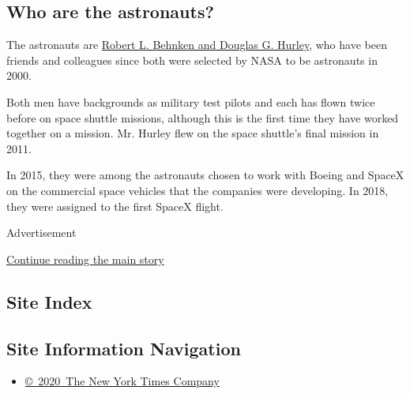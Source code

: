 \hypertarget{who-are-the-astronauts}{%
\subsection{Who are the astronauts?}\label{who-are-the-astronauts}}

The astronauts are
\href{https://www.nytimes3xbfgragh.onion/2020/05/27/science/bob-behnken-doug-hurley.html}{Robert
L. Behnken and Douglas G. Hurley}, who have been friends and colleagues
since both were selected by NASA to be astronauts in 2000.

Both men have backgrounds as military test pilots and each has flown
twice before on space shuttle missions, although this is the first time
they have worked together on a mission. Mr. Hurley flew on the space
shuttle's final mission in 2011.

In 2015, they were among the astronauts chosen to work with Boeing and
SpaceX on the commercial space vehicles that the companies were
developing. In 2018, they were assigned to the first SpaceX flight.

Advertisement

\protect\hyperlink{after-bottom}{Continue reading the main story}

\hypertarget{site-index}{%
\subsection{Site Index}\label{site-index}}

\hypertarget{site-information-navigation}{%
\subsection{Site Information
Navigation}\label{site-information-navigation}}

\begin{itemize}
\tightlist
\item
  \href{https://help.nytimes3xbfgragh.onion/hc/en-us/articles/115014792127-Copyright-notice}{©~2020~The
  New York Times Company}
\end{itemize}

